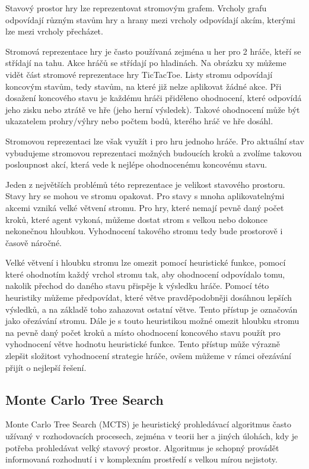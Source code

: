 Stavový prostor hry lze reprezentovat stromovým grafem. Vrcholy grafu odpovídají různým stavům hry a hrany mezi vrcholy odpovídají akcím, kterými lze mezi vrcholy přecházet. 

Stromová reprezentace hry je často používaná zejména u her pro 2 hráče, kteří se střídají na tahu. Akce hráčů se střídají po hladinách. Na obrázku xy můžeme vidět část stromové reprezentace hry TicTacToe. Listy stromu odpovídají koncovým stavům, tedy stavům, na které již nelze aplikovat žádné akce. Při dosažení koncového stavu je každému hráči přiděleno ohodnocení, které odpovídá jeho zisku nebo ztrátě ve hře (jeho herní výsledek). Takové ohodnocení může být ukazatelem prohry/výhry nebo počtem bodů, kterého hráč ve hře dosáhl. \citep{millington2016artificial}

Stromovou reprezentaci lze však využít i pro hru jednoho hráče. Pro aktuální stav vybudujeme stromovou reprezentaci možných budoucích kroků a zvolíme takovou posloupnost akcí, která vede k nejlépe ohodnocenému koncovému stavu. 

Jeden z největších problémů této reprezentace je velikost stavového prostoru. Stavy hry se mohou ve stromu opakovat. Pro stavy s mnoha aplikovatelnými akcemi vzniká velké větvení stromu. Pro hry, které nemají pevně daný počet kroků, které agent vykoná, můžeme dostat strom s velkou nebo dokonce nekonečnou hloubkou. Vyhodnocení takového stromu tedy bude prostorově i časově náročné.

Velké větvení i hloubku stromu lze omezit pomocí heuristické funkce, pomocí které ohodnotím každý vrchol stromu tak, aby ohodnocení odpovídalo tomu, nakolik přechod do daného stavu přispěje k výsledku hráče. Pomocí této heuristiky můžeme předpovídat, které větve pravděpodobněji dosáhnou lepších výsledků, a na základě toho zahazovat ostatní větve. Tento přístup je označován jako ořezávání stromu. Dále je s touto heuristikou možné omezit hloubku stromu na pevně daný počet kroků a místo ohodnocení koncového stavu použít pro vyhodnocení větve hodnotu heuristické funkce. Tento přístup může výrazně zlepšit složitost vyhodnocení strategie hráče, ovšem můžeme v rámci ořezávání přijít o nejlepší řešení.



\subsection{Monte Carlo Tree Search}

Monte Carlo Tree Search (MCTS) je heuristický prohledávací algoritmus často užívaný v rozhodovacích procesech, zejména v teorii her a jiných úlohách, kdy je potřeba prohledávat velký stavový prostor. Algoritmus je schopný provádět informovaná rozhodnutí i v komplexním prostředí s velkou mírou nejistoty.

